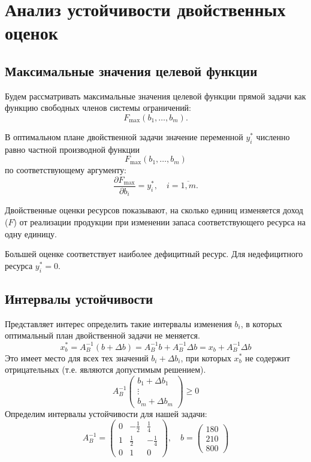 \documentclass[17pt]{extarticle}
\begin{document}
\section{Анализ устойчивости двойственных оценок}

\subsection{Максимальные значения целевой функции}
Будем рассматривать максимальные значения целевой функции прямой задачи как функцию свободных членов системы ограничений:
\[
    F_{\max} \left( b_1, \ldots, b_m \right).
\]
\begin{proposition}
    В оптимальном плане двойственной задачи значение переменной \( y_i^* \) численно равно частной производной функции
    \[
        F_{\max} \left( b_1, \ldots, b_m \right)
    \]
    по соответствующему аргументу:
    \[
        \frac{\partial F_{\max}}{\partial b_i} = y_i^*, \quad i = \overline{1, m}.
    \]

    Двойственные оценки ресурсов показывают,
    на сколько единиц изменяется доход (\( F \)) от реализации продукции при изменении запаса соответствующего ресурса на одну единицу.

    Большей оценке соответствует наиболее дефицитный ресурс. Для недефицитного ресурса \( y_i^* = 0 \).
\end{proposition}

\subsection{Интервалы устойчивости}
Представляет интерес определить такие интервалы изменения \( b_i \), в которых оптимальный план двойственной задачи не меняется.
\[
    x_b^* = A_B^{-1}(b + \Delta b) = A_B^{-1}b + A_B^{-1}\Delta b = x_b + A_B^{-1}\Delta b
\]
Это имеет место для всех тех значений \( b_i + \Delta b_i \), при которых \( x_b^* \) не содержит отрицательных (т.е. являются допустимым решением).
\[
    A_B^{-1}
    \begin{pmatrix}
        b_1 + \Delta b_1 \\
        \vdots           \\
        b_m + \Delta b_m
    \end{pmatrix}
    \geq 0
\]
Определим интервалы устойчивости для нашей задачи:
\[
    A_B^{-1} =
    \begin{pmatrix}
        0 & -\frac{1}{2} & \frac{1}{4}  \\
        1 & \frac{1}{2}  & -\frac{1}{4} \\
        0 & 1            & 0
    \end{pmatrix}, \quad b =
    \begin{pmatrix}
        180 \\
        210 \\
        800
    \end{pmatrix}
\]
\end{document}
